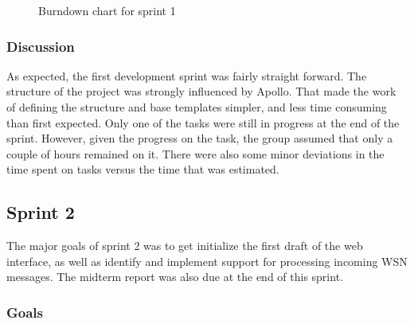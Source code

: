 \begin{center}
  \begin{figure}[ht!]
    \caption{Burndown chart for sprint 1}
    \label{fig:sprint 1, burndown}
  \end{figure}
\end{center}

\subsubsection{Discussion}

As expected, the first development sprint was fairly straight forward. The structure of the project was strongly influenced by Apollo. That made the work of defining the structure and base templates simpler, and less time consuming than first expected. Only one of the tasks were still in progress at the end of the sprint. However, given the progress on the task, the group assumed that only a couple of hours remained on it. There were also some minor deviations in the time spent on tasks versus the time that was estimated.

\subsection{Sprint 2}

The major goals of sprint 2 was to get initialize the first draft of the web interface, as well as identify and implement support for processing incoming WSN messages. The midterm report was also due at the end of this sprint.

\subsubsection{Goals}


